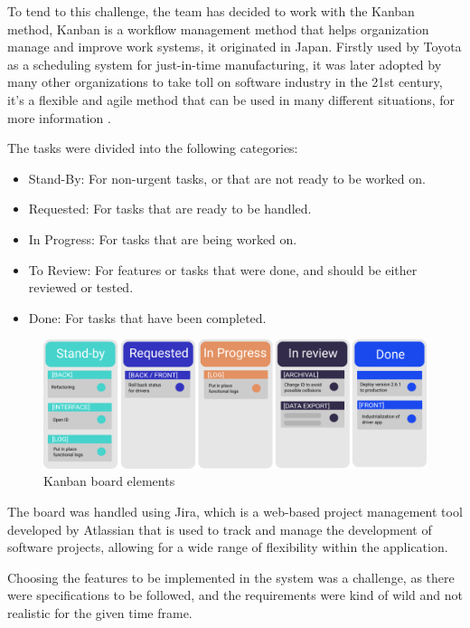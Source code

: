 To tend to this challenge, the team has decided to work with the
Kanban method, Kanban is a workflow management method that helps organization
manage and improve work systems, it originated in Japan. Firstly used by Toyota
as a scheduling system for just-in-time manufacturing, it was later adopted by
many other organizations to take toll on software industry in the 21st century, 
it's a flexible and agile method that can be used in many different situations,
for more information \cite{kanban_def}.


The tasks were divided into the following categories:
\begin{itemize}
    \item Stand-By: For non-urgent tasks, or that are not ready to be worked on.
    \item Requested: For tasks that are ready to be handled.
    \item In Progress: For tasks that are being worked on.
    \item To Review: For features or tasks that were done,
        and should be either reviewed or tested.
    \item Done: For tasks that have been completed.
\end{itemize}

\begin{figure}[!htpb]
    \centering
    \includegraphics[width=\textwidth]{images/kanban_mod.png}
    \caption{\footnotesize{Kanban board elements}}
    \label{fig:kanban-board-elements}
\end{figure}

The board was handled using Jira, which is a web-based project management tool developed
by Atlassian that is used to track and manage the development of software projects,
allowing for a wide range of flexibility within the application.

Choosing the features to be implemented in the system was a challenge,
as there were specifications to be followed, and the requirements were
kind of wild and not realistic for the given time frame.

